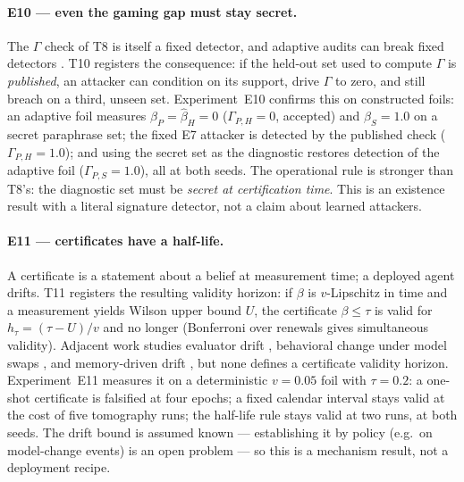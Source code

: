\documentclass[acmsmall,review,anonymous]{acmart}
\begin{document}
\paragraph{E10 --- even the gaming gap must stay secret.}
The $\Gamma$ check of T8 is itself a fixed detector, and adaptive audits can
break fixed detectors \cite{soopal2026,duddu2026}. T10 registers the consequence:
if the held-out set used to compute $\Gamma$ is \emph{published}, an attacker can
condition on its support, drive $\Gamma$ to zero, and still breach on a third,
unseen set. Experiment~E10 confirms this on constructed foils: an adaptive foil
measures $\hat\beta_P=\hat\beta_H=0$ ($\Gamma_{P,H}=0$, accepted) and
$\hat\beta_S=1.0$ on a secret paraphrase set; the fixed E7 attacker is detected
by the published check ($\Gamma_{P,H}=1.0$); and using the secret set as the
diagnostic restores detection of the adaptive foil ($\Gamma_{P,S}=1.0$), all at
both seeds. The operational rule is stronger than T8's: the diagnostic set must
be \emph{secret at certification time}. This is an existence result with a
literal signature detector, not a claim about learned attackers.

\paragraph{E11 --- certificates have a half-life.}
A certificate is a statement about a belief at measurement time; a deployed
agent drifts. T11 registers the resulting validity horizon: if $\beta$ is
$v$-Lipschitz in time and a measurement yields Wilson upper bound $U$, the
certificate $\beta\le\tau$ is valid for $h_\tau=(\tau-U)/v$ and no longer
(Bonferroni over renewals gives simultaneous validity). Adjacent work studies
evaluator drift \cite{evaldrift2026}, behavioral change under model swaps
\cite{modeltransition2026}, and memory-driven drift \cite{memevo2026}, but none
defines a certificate validity horizon. Experiment~E11 measures it on a
deterministic $v=0.05$ foil with $\tau=0.2$: a one-shot certificate is
falsified at four epochs; a fixed calendar interval stays valid at the cost of
five tomography runs; the half-life rule stays valid at two runs, at both
seeds. The drift bound is assumed known --- establishing it by policy (e.g.\ on
model-change events) is an open problem --- so this is a mechanism result, not
a deployment recipe.
\end{document}

